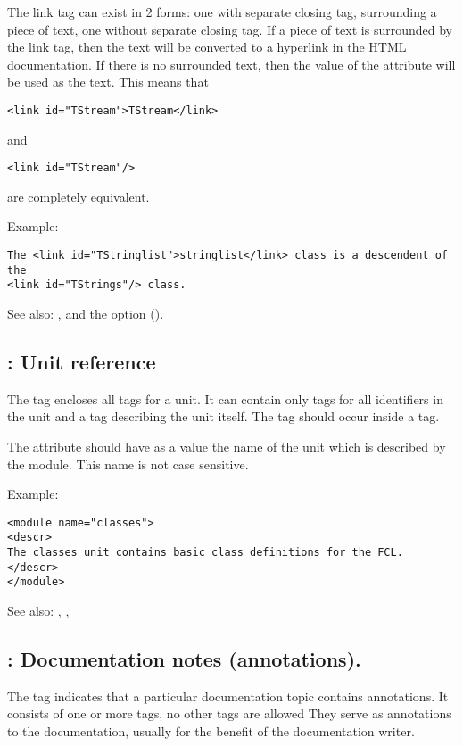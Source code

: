 The link tag can exist in 2 forms: one with separate closing tag,
surrounding a piece of text, one without separate closing tag. If a piece of
text is surrounded by the link tag, then the text will be converted to a
hyperlink in the HTML documentation. If there is no surrounded text, then
the value of the  attribute will be used as the text. This means
that
\begin{verbatim}
<link id="TStream">TStream</link>
\end{verbatim}
and
\begin{verbatim}
<link id="TStream"/>
\end{verbatim}
are completely equivalent.

Example:
\begin{verbatim}
The <link id="TStringlist">stringlist</link> class is a descendent of the
<link id="TStrings"/> class.
\end{verbatim}

See also: ,  and the  option ().

\subsection{ : Unit reference}
\label{tag:module}
The  tag encloses all  tags for a unit. It can
contain only  tags for all identifiers in the unit and 
a  tag describing the unit itself. The  tag should
occur inside a  tag.

The  attribute should have as a value the name of the unit which
is described by the module. This name is not case sensitive.

Example:
\begin{verbatim}
<module name="classes">
<descr>
The classes unit contains basic class definitions for the FCL.
</descr>
</module>
\end{verbatim}

See also: , , 
\subsection{ : Documentation notes (annotations).}
\label{tag:notes}
The  tag indicates that a particular documentation topic contains annotations. 
It consists of one or more  tags, no other tags are allowed
They serve as annotations to the documentation, usually for the benefit of the documentation writer.

